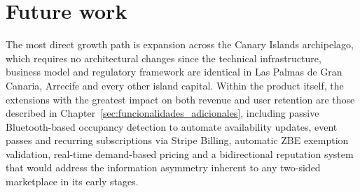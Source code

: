 \section{Future work}
\label{sec:future_work}

The most direct growth path is expansion across the Canary Islands archipelago, which requires no architectural changes since the technical infrastructure, business model and regulatory framework are identical in Las Palmas de Gran Canaria, Arrecife and every other island capital. Within the product itself, the extensions with the greatest impact on both revenue and user retention are those described in Chapter~\ref{sec:funcionalidades_adicionales}, including passive Bluetooth-based occupancy detection to automate availability updates, event passes and recurring subscriptions via Stripe Billing, automatic ZBE exemption validation, real-time demand-based pricing and a bidirectional reputation system that would address the information asymmetry inherent to any two-sided marketplace in its early stages.
